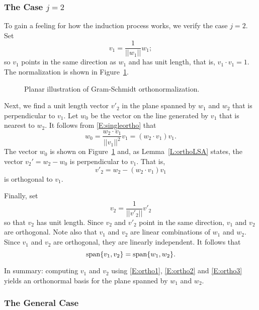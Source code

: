 \documentclass{ximera}
\begin{document}
\subsubsection*{The Case $j=2$}

To gain a feeling for how the induction process works, we verify the case
$j=2$.  Set
\begin{equation}  \label{E:ortho1}
v_1 = \frac{1}{||w_1||}w_1;
\end{equation}
so $v_1$ points in the same direction as $w_1$ and has unit length, that is,
$v_1\cdot v_1=1$.  The normalization is shown in Figure~\ref{F:gram}.

\begin{figure}[htb]
        \centerline{%
        }
        \caption{Planar illustration of Gram-Schmidt orthonormalization.}
        \label{F:gram}
\end{figure}

Next, we find a unit length vector $v'_2$ in the plane spanned by $w_1$ and
$w_2$ that is perpendicular
to $v_1$. Let $w_0$ be the vector on the line
generated by $v_1$ that is nearest to $w_2$.  It follows from
\eqref{E:singleortho} that
\[
w_0 = \frac{w_2\cdot v_1}{||v_1||^2}v_1 = (w_2\cdot v_1) v_1.
\]
The vector $w_0$ is shown on Figure~\ref{F:gram} and, as
Lemma~\ref{L:orthoLSA} states, the vector $v_2'=w_2-w_0$ is perpendicular to
$v_1$. That is,
\begin{equation}  \label{E:ortho2}
v'_2 = w_2 - (w_2\cdot v_1) v_1
\end{equation}
is orthogonal to $v_1$.

Finally, set
\begin{equation}  \label{E:ortho3}
v_2 = \frac{1}{||v'_2||}v'_2
\end{equation}
so that $v_2$ has unit length.  Since $v_2$ and $v'_2$ point in the
same direction, $v_1$ and $v_2$ are orthogonal.  Note also that $v_1$ and
$v_2$ are linear combinations of $w_1$ and $w_2$.  Since $v_1$ and $v_2$ are
orthogonal, they are linearly independent.  It follows that
\[
{\rm span}\{v_1,v_2\} = {\rm span}\{w_1,w_2\}.
\]

In summary: computing $v_1$ and $v_2$ using \eqref{E:ortho1}, \eqref{E:ortho2}
and \eqref{E:ortho3} yields an orthonormal basis for the
plane spanned by $w_1$ and $w_2$.

\subsubsection*{The General Case}
\end{document}
